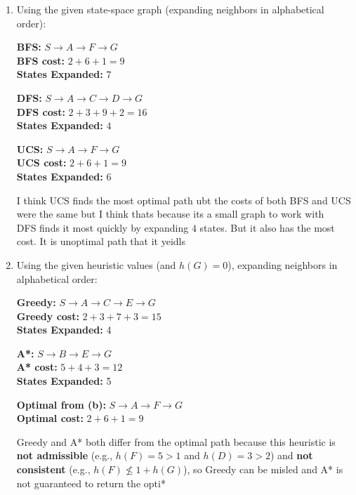 \documentclass{article}
\begin{document}
\begin{enumerate}[label=(\alph*)]
\item %
Using the given state-space graph (expanding neighbors in alphabetical order):

\textbf{BFS:} $S \rightarrow A \rightarrow F \rightarrow G$ \\
\textbf{BFS cost:} $2 + 6 + 1 = 9$ \\ 
\textbf{States Expanded:} $7$

\medskip

\textbf{DFS:} $S \rightarrow A \rightarrow C \rightarrow D \rightarrow G$ \\
\textbf{DFS cost:} $2 + 3 + 9 + 2 = 16$ \\ 
\textbf{States Expanded:} $4$

\medskip

\textbf{UCS:} $S \rightarrow A \rightarrow F \rightarrow G$ \\
\textbf{UCS cost:} $2 + 6 + 1 = 9$ \\
\textbf{States Expanded:} $6$

I think UCS finds the most optimal path ubt the costs of both BFS and UCS were the same but I think thats because its a small graph to work with \\ 
DFS finds it most quickly by expanding $4$ states. But it also has the most cost. It is unoptimal path that it yeidls

\item %

Using the given heuristic values (and $h(G)=0$), expanding neighbors in alphabetical order:

\textbf{Greedy:} $S \rightarrow A \rightarrow C \rightarrow E \rightarrow G$ \\
\textbf{Greedy cost:} $2+3+7+3=15$ \\
\textbf{States Expanded:} 4

\medskip
\textbf{A*:} $S \rightarrow B \rightarrow E \rightarrow G$ \\
\textbf{A* cost:} $5+4+3=12$ \\
\textbf{States Expanded:} 5

\medskip
\textbf{Optimal from (b):} $S \rightarrow A \rightarrow F \rightarrow G$ \\
\textbf{Optimal cost:} $2+6+1=9$

\medskip
Greedy and A* both differ from the optimal path because this heuristic is \textbf{not admissible}
(e.g., $h(F)=5 > 1$ and $h(D)=3 > 2$) and \textbf{not consistent}
(e.g., $h(F) \nleq 1+h(G)$), so Greedy can be misled and A* is not guaranteed to return the opti*


\end{enumerate}
\end{document}
